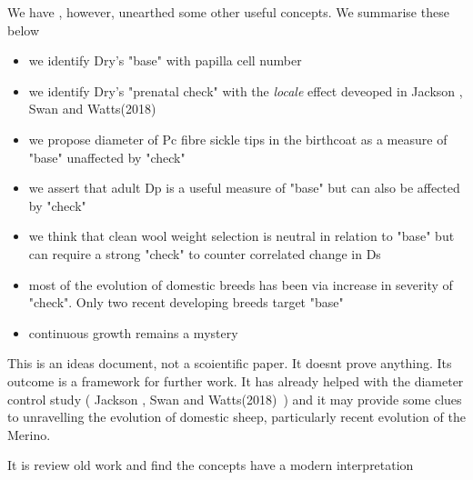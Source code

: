 \documentclass[titlepage]{article}  %
\begin{document}
We have , however, unearthed some other useful concepts. We summarise these below
\begin{itemize}
\item we identify Dry's "base" with papilla cell number
\item we identify Dry's "prenatal check" with the {\em locale} effect deveoped in Jackson , Swan and Watts(2018)~\cite{jackswan:18}
\item we propose diameter of Pc fibre sickle tips in the birthcoat as a measure of "base" unaffected by "check"
\item we assert that adult Dp is a useful measure of "base" but can also be affected by "check"
\item  we think that clean wool weight selection is neutral in relation to "base" but can require a strong "check" to counter correlated change in Ds
\item most of the evolution of domestic breeds has been via increase in severity of "check". Only two recent developing breeds target "base"
\item continuous growth remains a mystery
\end{itemize}

This is an ideas document, not a scoientific paper. It doesnt prove anything. Its outcome is a framework for further work.  It has already helped with the diameter control study ( Jackson , Swan and Watts(2018)~\cite{jackswan:18}) and it may provide some clues to unravelling the evolution of domestic sheep, particularly recent evolution of the Merino.

It is review old work and find the concepts have a modern interpretation
\end{document}
